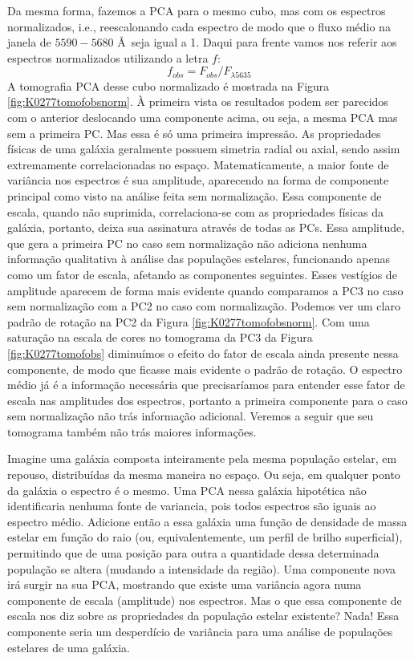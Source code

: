Da mesma forma, fazemos a PCA para o mesmo cubo, mas com os espectros normalizados, i.e., reescalonando cada espectro de
modo que o fluxo médio na janela de $5590-5680$ \AA\ seja igual a 1. Daqui para frente vamos nos referir aos espectros
normalizados utilizando a letra $f$:
\begin{equation}
f_{obs} = F_{obs} / F_{\lambda5635}
\end{equation} 
\noindent A tomografia PCA desse cubo normalizado é mostrada na Figura \ref{fig:K0277tomofobsnorm}. À primeira vista os
resultados podem ser parecidos com o anterior deslocando uma componente acima, ou seja, a mesma PCA mas sem a primeira
PC. Mas essa é só uma primeira impressão. As propriedades físicas de uma galáxia geralmente possuem simetria radial ou
axial, sendo assim extremamente correlacionadas no espaço. Matematicamente, a maior fonte de variância nos espectros é
sua amplitude, aparecendo na forma de componente principal como visto na análise feita sem normalização. Essa componente
de escala, quando não suprimida, correlaciona-se com as propriedades físicas da galáxia, portanto, deixa sua assinatura
através de todas as PCs. Essa amplitude, que gera a primeira PC no caso sem normalização não adiciona nenhuma informação
qualitativa à análise das populações estelares, funcionando apenas como um fator de escala, afetando as componentes
seguintes. Esses vestígios de amplitude aparecem de forma mais evidente quando comparamos a PC3 no caso sem normalização
com a PC2 no caso com normalização. Podemos ver um claro padrão de rotação na PC2 da Figura \ref{fig:K0277tomofobsnorm}.
Com uma saturação na escala de cores no tomograma da PC3 da Figura \ref{fig:K0277tomofobs} diminuímos o efeito do fator
de escala ainda presente nessa componente, de modo que ficasse mais evidente o padrão de rotação. O espectro médio já é
a informação necessária que precisaríamos para entender esse fator de escala nas amplitudes dos espectros, portanto a
primeira componente para o caso sem normalização não trás informação adicional. Veremos a seguir que seu tomograma
também não trás maiores informações.

Imagine uma galáxia composta inteiramente pela mesma população estelar, em repouso, distribuídas da mesma maneira no
espaço. Ou seja, em qualquer ponto da galáxia o espectro é o mesmo. Uma PCA nessa galáxia hipotética não identificaria
nenhuma fonte de variancia, pois todos espectros são iguais ao espectro médio. Adicione então a essa galáxia uma função
de densidade de massa estelar em função do raio (ou, equivalentemente, um perfil de brilho superficial), permitindo que
de uma posição para outra a quantidade dessa determinada população se altera (mudando a intensidade da região). Uma
componente nova irá surgir na sua PCA, mostrando que existe uma variância agora numa componente de escala (amplitude)
nos espectros. Mas o que essa componente de escala nos diz sobre as propriedades da população estelar existente? Nada!
Essa componente seria um desperdício de variância para uma análise de populações estelares de uma galáxia.


